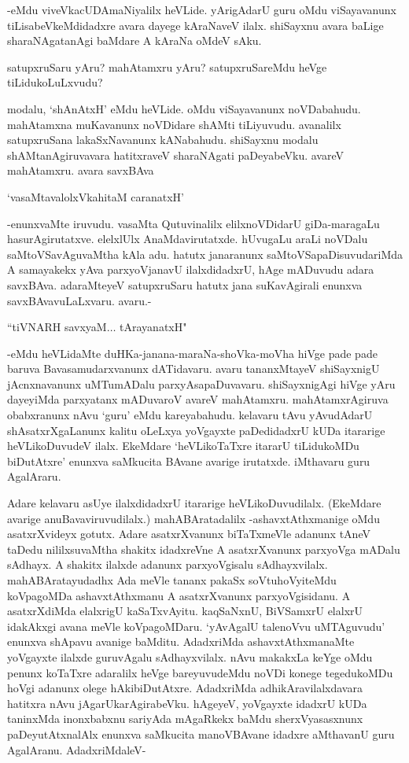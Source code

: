 -eMdu viveVkacUDAmaNiyalilx heVLide. yArigAdarU guru oMdu viSayavanunx tiLisabeVkeMdidadxre avara dayege kAraNaveV ilalx. shiSayxnu avara baLige sharaNAgatanAgi baMdare A kAraNa oMdeV sAku.

satupxruSaru yAru? mahAtamxru yAru? satupxruSareMdu heVge tiLidukoLuLxvudu?

modalu, `shAnAtxH' eMdu heVLide. oMdu viSayavanunx noVDabahudu. mahAtamxna muKavanunx noVDidare shAMti tiLiyuvudu. avanalilx satupxruSana lakaSxNavanunx kANabahudu. shiSayxnu modalu shAMtanAgiruvavara hatitxraveV sharaNAgati paDeyabeVku. avareV mahAtamxru. avara savxBAva

\begin{shloka}
`vasaMtavalolxVkahitaM caranatxH'
\end{shloka}

-enunxvaMte iruvudu. vasaMta Qutuvinalilx elilxnoVDidarU giDa-maragaLu hasurAgirutatxve. elelxlUlx AnaMdavirutatxde. hUvugaLu araLi noVDalu saMtoVSavAguvaMtha kAla adu. hatutx janaranunx saMtoVSapaDisuvudariMda A samayakekx yAva parxyoVjanavU ilalxdidadxrU, hAge mADuvudu adara savxBAva. adaraMteyeV satupxruSaru hatutx jana suKavAgirali enunxva savxBAvavuLaLxvaru. avaru.-

\begin{shloka}
``tiVNARH savxyaM$\ldots$ tArayanatxH"
\end{shloka}

-eMdu heVLidaMte duHKa-janana-maraNa-shoVka-moVha hiVge pade pade baruva Bavasamudarxvanunx dATidavaru. avaru tananxMtayeV shiSayxnigU jAcnxnavanunx uMTumADalu parxyAsapaDuvavaru. shiSayxnigAgi hiVge yAru dayeyiMda parxyatanx mADuvaroV avareV mahAtamxru. mahAtamxrAgiruva obabxranunx nAvu `guru' eMdu kareyabahudu. kelavaru tAvu yAvudAdarU shAsatxrXgaLanunx kalitu oLeLxya yoVgayxte paDedidadxrU kUDa itararige heVLikoDuvudeV ilalx. EkeMdare `heVLikoTaTxre itararU tiLidukoMDu biDutAtxre' enunxva saMkucita BAvane avarige irutatxde. iMthavaru guru AgalAraru.

Adare kelavaru asUye ilalxdidadxrU itararige heVLikoDuvudilalx. (EkeMdare avarige anuBavaviruvudilalx.) mahABAratadalilx -ashavxtAthxmanige oMdu asatxrXvideyx gotutx. Adare asatxrXvanunx biTaTxmeVle adanunx tAneV taDedu nililxsuvaMtha shakitx idadxreVne A asatxrXvanunx parxyoVga mADalu sAdhayx. A shakitx ilalxde adanunx parxyoVgisalu sAdhayxvilalx. mahABAratayudadhx Ada meVle tananx pakaSx soVtuhoVyiteMdu koVpagoMDa ashavxtAthxmanu A asatxrXvanunx parxyoVgisidanu. A asatxrXdiMda elalxrigU kaSaTxvAyitu. kaqSaNxnU, BiVSamxrU elalxrU idakAkxgi avana meVle koVpagoMDaru. `yAvAgalU talenoVvu uMTAguvudu' enunxva shApavu avanige baMditu. AdadxriMda ashavxtAthxmanaMte yoVgayxte ilalxde guruvAgalu sAdhayxvilalx. nAvu makakxLa keYge oMdu penunx koTaTxre adaralilx heVge bareyuvudeMdu noVDi konege tegedukoMDu hoVgi adanunx olege hAkibiDutAtxre. AdadxriMda adhikAravilalxdavara hatitxra nAvu jAgarUkarAgirabeVku. hAgeyeV, yoVgayxte idadxrU kUDa taninxMda inonxbabxnu sariyAda mAgaRkekx baMdu sherxVyasasxnunx paDeyutAtxnalAlx enunxva saMkucita manoVBAvane idadxre aMthavanU guru AgalAranu. AdadxriMdaleV-

